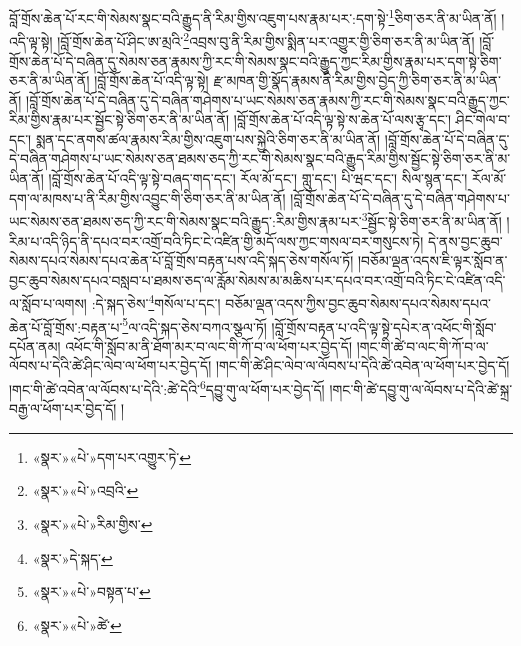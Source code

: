 བློ་གྲོས་ཆེན་པོ་རང་གི་སེམས་སྣང་བའི་རྒྱུད་ནི་རིམ་གྱིས་འཇུག་པས་རྣམ་པར་:དག་སྟེ་\footnote{«སྣར་»«པེ་»དག་པར་འགྱུར་ཏེ་}ཅིག་ཅར་ནི་མ་ཡིན་ནོ། །འདི་ལྟ་སྟེ། །བློ་གྲོས་ཆེན་པོ་ཤིང་ཨ་མྲའི་\footnote{«སྣར་»«པེ་»འབྲའི་}འབྲས་བུ་ནི་རིམ་གྱིས་སྨིན་པར་འགྱུར་གྱི་ཅིག་ཅར་ནི་མ་ཡིན་ནོ། །བློ་གྲོས་ཆེན་པོ་དེ་བཞིན་དུ་སེམས་ཅན་རྣམས་ཀྱི་རང་གི་སེམས་སྣང་བའི་རྒྱུད་ཀྱང་རིམ་གྱིས་རྣམ་པར་དག་སྟེ་ཅིག་ཅར་ནི་མ་ཡིན་ནོ། །བློ་གྲོས་ཆེན་པོ་འདི་ལྟ་སྟེ། རྫ་མཁན་གྱི་སྣོད་རྣམས་ནི་རིམ་གྱིས་བྱེད་ཀྱི་ཅིག་ཅར་ནི་མ་ཡིན་ནོ། །བློ་གྲོས་ཆེན་པོ་དེ་བཞིན་དུ་དེ་བཞིན་གཤེགས་པ་ཡང་སེམས་ཅན་རྣམས་ཀྱི་རང་གི་སེམས་སྣང་བའི་རྒྱུད་ཀྱང་རིམ་གྱིས་རྣམ་པར་སྦྱོང་སྟེ་ཅིག་ཅར་ནི་མ་ཡིན་ནོ། །བློ་གྲོས་ཆེན་པོ་འདི་ལྟ་སྟེ་ས་ཆེན་པོ་ལས་རྩྭ་དང་། ཤིང་གེལ་བ་དང་། སྨན་དང་ནགས་ཚལ་རྣམས་རིམ་གྱིས་འཇུག་པས་སྐྱེའི་ཅིག་ཅར་ནི་མ་ཡིན་ནོ། །བློ་གྲོས་ཆེན་པོ་དེ་བཞིན་དུ་དེ་བཞིན་གཤེགས་པ་ཡང་སེམས་ཅན་ཐམས་ཅད་ཀྱི་རང་གི་སེམས་སྣང་བའི་རྒྱུད་རིམ་གྱིས་སྦྱོང་སྟེ་ཅིག་ཅར་ནི་མ་ཡིན་ནོ། །བློ་གྲོས་ཆེན་པོ་འདི་ལྟ་སྟེ་བཞད་གད་དང་། རོལ་མོ་དང་། གླུ་དང་། པི་ཝང་དང་། སིལ་སྙན་དང་། རོལ་མོ་དག་ལ་མཁས་པ་ནི་རིམ་གྱིས་འབྱུང་གི་ཅིག་ཅར་ནི་མ་ཡིན་ནོ། །བློ་གྲོས་ཆེན་པོ་དེ་བཞིན་དུ་དེ་བཞིན་གཤེགས་པ་ཡང་སེམས་ཅན་ཐམས་ཅད་ཀྱི་རང་གི་སེམས་སྣང་བའི་རྒྱུད་:རིམ་གྱིས་རྣམ་པར་\footnote{«སྣར་»«པེ་»རིམ་གྱིས་}སྦྱོང་སྟེ་ཅིག་ཅར་ནི་མ་ཡིན་ནོ། །རིམ་པ་འདི་ཉིད་ནི་དཔའ་བར་འགྲོ་བའི་ཏིང་ངེ་འཛིན་གྱི་མདོ་ལས་ཀྱང་གསལ་བར་གསུངས་ཏེ། དེ་ནས་བྱང་ཆུབ་སེམས་དཔའ་སེམས་དཔའ་ཆེན་པོ་བློ་གྲོས་བརྟན་པས་འདི་སྐད་ཅེས་གསོལ་ཏོ། །བཅོམ་ལྡན་འདས་ཇི་ལྟར་སློབ་ན་བྱང་ཆུབ་སེམས་དཔའ་བསླབ་པ་ཐམས་ཅད་ལ་རློམ་སེམས་མ་མཆིས་པར་དཔའ་བར་འགྲོ་བའི་ཏིང་ངེ་འཛིན་འདི་ལ་སློབ་པ་ལགས། :དེ་སྐད་ཅེས་\footnote{«སྣར་»དེ་སྐད་}གསོལ་པ་དང་། བཅོམ་ལྡན་འདས་ཀྱིས་བྱང་ཆུབ་སེམས་དཔའ་སེམས་དཔའ་ཆེན་པོ་བློ་གྲོས་:བརྟན་པ་\footnote{«སྣར་»«པེ་»བསྟན་པ་}ལ་འདི་སྐད་ཅེས་བཀའ་སྩལ་ཏོ། །བློ་གྲོས་བརྟན་པ་འདི་ལྟ་སྟེ་དཔེར་ན་འཕོང་གི་སློབ་དཔོན་ནམ། འཕོང་གི་སློབ་མ་ནི་ཐོག་མར་བ་ལང་གི་ཀོ་བ་ལ་ཕོག་པར་བྱེད་དོ། །གང་གི་ཚེ་བ་ལང་གི་ཀོ་བ་ལ་ལོབས་པ་དེའི་ཚེ་ཤིང་ལེབ་ལ་ཕོག་པར་བྱེད་དོ། །གང་གི་ཚེ་ཤིང་ལེབ་ལ་ལོབས་པ་དེའི་ཚེ་འབེན་ལ་ཕོག་པར་བྱེད་དོ། །གང་གི་ཚེ་འབེན་ལ་ལོབས་པ་དེའི་:ཚེ་དེའི་\footnote{«སྣར་»«པེ་»ཚེ་}དབྱུ་གུ་ལ་ཕོག་པར་བྱེད་དོ། །གང་གི་ཚེ་དབྱུ་གུ་ལ་ལོབས་པ་དེའི་ཚེ་སྐྲ་བརྒྱ་ལ་ཕོག་པར་བྱེད་དོ། །
